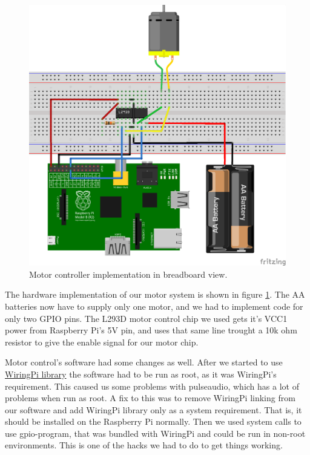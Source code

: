 \documentclass[english,11pt,twoside,a4paper]{article}
\begin{document}
\begin{figure}
  \begin{center}
    \includegraphics[scale=0.75]{motor_controllers_l293d_impl_bb.png}
    \caption{Motor controller implementation in breadboard view.}
  \end{center}
  \label{l293d_bb_impl}
\end{figure}

The hardware implementation of our motor system is shown in figure \ref{l293d_bb_impl}. The AA batteries now have to supply only one motor, and we had to implement code for only two GPIO pins. The L293D motor control chip we used gets it's VCC1 power from Raspberry Pi's 5V pin, and uses that same line trought a 10k ohm resistor to give the enable signal for our motor chip.

Motor control's software had some changes as well. After we started to use \href{http://wiringpi.com}{WiringPi library} the software had to be run as root, as it was WiringPi's requirement. This caused us some problems with pulseaudio, which has a lot of problems when run as root. A fix to this was to remove WiringPi linking from our software and add WiringPi library only as a system requirement. That is, it should be installed on the Raspberry Pi normally. Then we used system calls to use gpio-program, that was bundled with WiringPi and could be run in non-root environments. This is one of the hacks we had to do to get things working.
\end{document}
